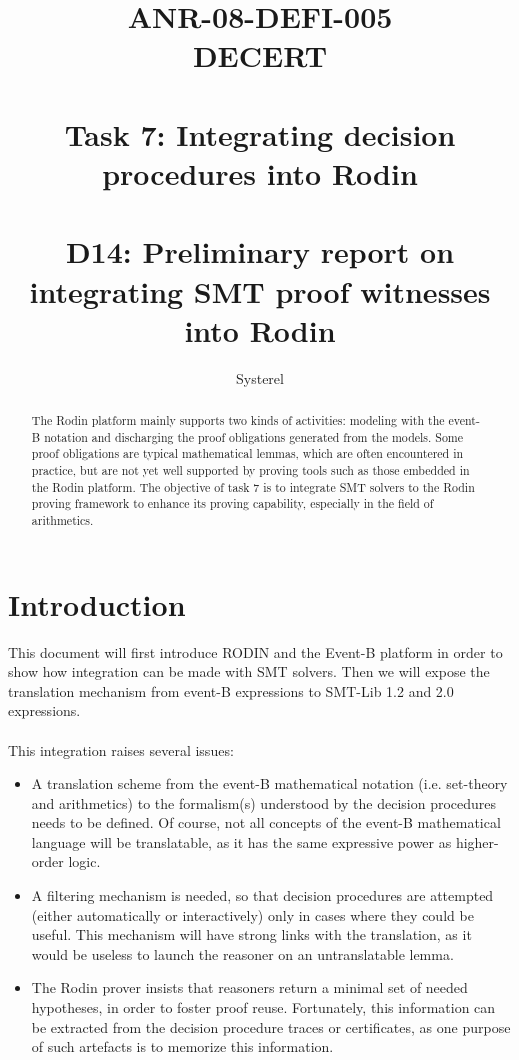 \documentclass[10pt,a4paper]{report}
\title{ANR-08-DEFI-005 \\ DECERT \\ ~ \\ Task 7: Integrating decision procedures into Rodin \\ ~ \\ D14: Preliminary report on integrating SMT proof witnesses into Rodin}
\author{Systerel}
\begin{document}
\maketitle

\begin{abstract}

The Rodin platform \cite{RODIN} mainly supports two kinds of activities: modeling with the event-B notation and discharging the proof obligations generated from the models. 
Some proof obligations are typical mathematical lemmas, which are often encountered in practice, but are not yet well supported by proving tools such as those embedded in the Rodin platform.
The objective of task 7 is to integrate SMT solvers to the Rodin proving framework to enhance its proving capability, especially in the field of arithmetics.

\end{abstract}

\tableofcontents

\section{Introduction}
This document will first introduce RODIN and the Event-B platform in order to show how integration can be made with SMT solvers. Then we will expose the translation mechanism from event-B expressions to SMT-Lib 1.2 and 2.0 expressions.  

\paragraph{}
This integration raises several issues:
\begin{itemize}
\item A translation scheme from the event-B mathematical notation (i.e. set-theory and arithmetics) to the formalism(s) understood by the decision procedures needs to be defined. Of course, not all
concepts of the event-B mathematical language will be translatable, as it has the same expressive
power as higher-order logic.
\item A filtering mechanism is needed, so that decision procedures are attempted (either automatically or interactively) only in cases where they could be useful. This mechanism will have strong links with the translation, as it would be useless to launch the reasoner on an untranslatable lemma.
\item The Rodin prover insists that reasoners return a minimal set of needed hypotheses, in order to foster proof reuse. Fortunately, this information can be extracted from the decision procedure
traces or certificates, as one purpose of such artefacts is to memorize this information.
\end{itemize}
\end{document}
